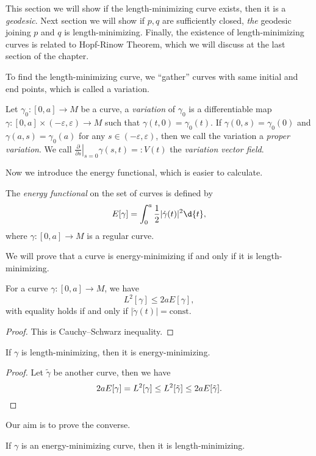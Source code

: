 This section we will show if the length-minimizing curve exists, then it is a \emph{geodesic}.
Next section we will show if $p,q$ are sufficiently closed, \emph{the} geodesic joining $p$ and $q$ is length-minimizing.
Finally, the existence of length-minimizing curves is related to Hopf-Rinow Theorem, which we will discuss at the last section of the chapter.

To find the length-minimizing curve, we ``gather'' curves with same initial and end points, which is called a variation.
\begin{defn}
    Let $\gamma_0:[0,a]\to M$ be a curve, a \emph{variation} of $\gamma_0$ is a differentiable map $\gamma:[0,a]\times(-\varepsilon,\varepsilon)\to M$ such that $\gamma(t,0)=\gamma_0(t)$.
    If $\gamma(0,s)=\gamma_0(0)$ and $\gamma(a,s)=\gamma_0(a)$ for any $s\in(-\varepsilon,\varepsilon)$, then we call the variation a \emph{proper variation}.
    We call $\left.\frac{\partial{}}{\partial{s}}\right|_{s=0}\gamma(s,t)=:V(t)$ the \emph{variation vector field}.
\end{defn}

Now we introduce the energy functional, which is easier to calculate.
\begin{defn}
    The \emph{energy functional} on the set of curves is defined by
    \[E[\gamma]=\int_0^a\frac{1}{2}|\dot{\gamma}(t)|^2\d{t},\]
    where $\gamma:[0,a]\to M$ is a regular curve.
\end{defn}

We will prove that a curve is energy-minimizing if and only if it is length-minimizing.
\begin{lem}
    For a curve $\gamma:[0,a]\to M$, we have
    \[L^2[\gamma]\leq 2aE[\gamma],\]
    with equality holds if and only if $|\dot\gamma(t)|=\mathrm{const}$.
\end{lem}
\begin{proof}
    This is Cauchy--Schwarz inequality.
\end{proof}

\begin{prop}
    If $\gamma$ is length-minimizing, then it is energy-minimizing.
\end{prop}
\begin{proof}
    Let $\tilde\gamma$ be another curve, then we have
    \[2aE[\gamma]=L^2[\gamma]\leq L^2[\tilde\gamma]\leq 2aE[\tilde\gamma].\qedhere\]
\end{proof}

Our aim is to prove the converse.
\begin{prop}\label{energy-min to length-min}
    If $\gamma$ is an energy-minimizing curve, then it is length-minimizing.
\end{prop}

